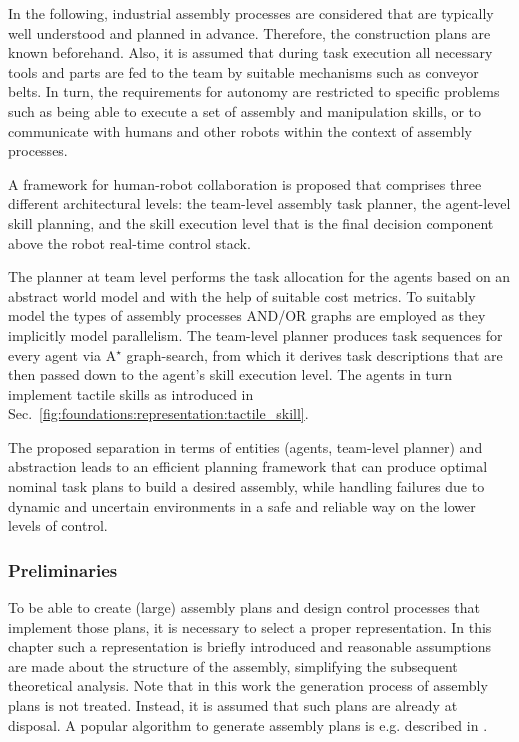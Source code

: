 In the following, industrial assembly processes are considered that are typically well understood and planned in advance.
Therefore, the construction plans are known beforehand.
Also, it is assumed that during task execution all necessary tools and parts are fed to the team by suitable mechanisms such as conveyor belts.
In turn, the requirements for autonomy are restricted to specific problems such as being able to execute a set of assembly and manipulation skills, or to communicate with humans and other robots within the context of assembly processes.

A framework for human-robot collaboration is proposed that comprises three different architectural levels: the team-level assembly task planner, the agent-level skill planning, and the skill execution level that is the final decision component above the robot real-time control stack.

The planner at team level performs the task allocation for the agents based on an abstract world model and with the help of suitable cost metrics.
To suitably model the types of assembly processes AND/OR graphs \cite{HomemdeMello.1990} are employed as they implicitly model parallelism.
The team-level planner produces task sequences for every agent via A$^\star$ graph-search, from which it derives task descriptions that are then passed down to the agent's skill execution level.
The agents in turn implement tactile skills as introduced in Sec.~\ref{fig:foundations:representation:tactile_skill}.

The proposed separation in terms of entities (agents, team-level planner) and abstraction leads to an efficient planning framework that can produce optimal nominal task plans to build a desired assembly, while handling failures due to dynamic and uncertain environments in a safe and reliable way on the lower levels of control.

\subsubsection{Preliminaries}

To be able to create (large) assembly plans and design control processes that implement those plans, it is necessary to select a proper representation.
In this chapter such a representation is briefly introduced and reasonable assumptions are made about the structure of the assembly, simplifying the subsequent theoretical analysis.
Note that in this work the generation process of assembly plans is not treated.
Instead, it is assumed that such plans are already at disposal.
A popular algorithm to generate assembly plans is e.g. described in \cite{HomemdeMello.1989}.


